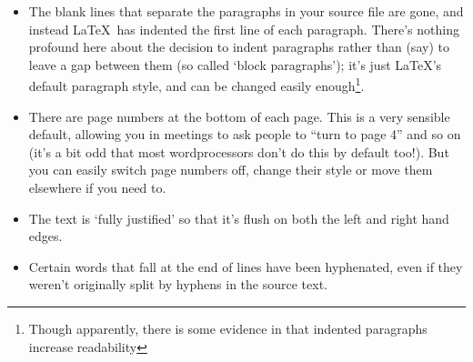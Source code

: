 \begin{itemize}
\item The blank lines that separate the paragraphs in your source file are gone, and instead \LaTeX\ has indented the first line of each paragraph. There's nothing profound here about the decision to indent paragraphs rather than (say) to leave a gap between them (so called `block paragraphs'); it's just \LaTeX's default paragraph style, and can be changed easily enough\footnote{Though apparently, there is some evidence in \cite{tinker63} that indented paragraphs increase readability}.
\item There are page numbers at the bottom of each page. This is a very sensible default, allowing you in meetings to ask people to ``turn to page 4'' and so on (it's a bit odd that most wordprocessors don't do this by default too!). But you can easily switch page numbers off, change their style or move them elsewhere if you need to. 
\item The text is `fully justified' so that it's flush on both the left and right hand edges.
\item Certain words that fall at the end of lines have been hyphenated, even if they weren't originally split by hyphens in the source text.
\end{itemize}

